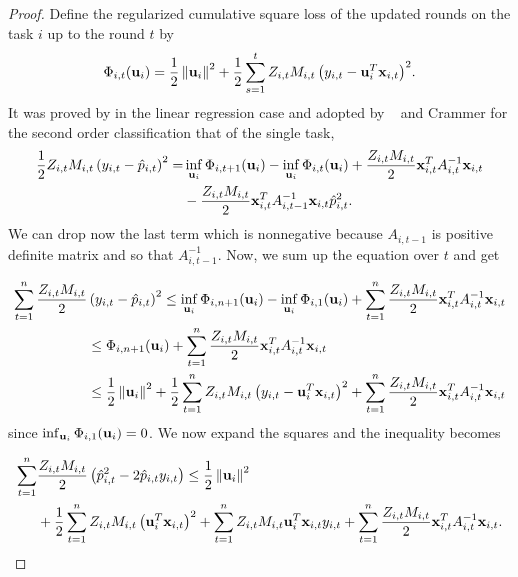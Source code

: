 \begin{proof}
Define the regularized cumulative square loss of the updated rounds on the task 
$i$ up to the round $t$ by
\begin{equation*}
\Phi_{i,t}(\mathbf{u}_i)=\frac{1}{2}\left\Vert {\mathbf{u}_i} \right\Vert^2+\frac{1}{2}\sum_{s=1}^{t}{Z_{i,t}M_{i,t}\left({y_{i,t}-\mathbf{u}_i^T\mathbf{x}_{i,t}}\right)}^2.
\end{equation*}
It was proved by \cite{Forster} in the linear regression case and adopted by
~\cite{cesa2006worst} and Crammer \cite{crammer2014doubly} for the second order classification that of the single task,
\begin{equation*}
\begin{split}
\frac{1}{2} Z_{i,t}M_{i,t}\left({y_{i,t}-\hat{p}_{i,t}}\right)^{2}= &\inf_{\mathbf{u}_i}{\Phi_{i,t+1}}(\mathbf{u}_i)-\inf_{\mathbf{u}_i}{\Phi_{i,t}}(\mathbf{u}_i)
+\frac{Z_{i,t}M_{i,t}}{2}\mathbf{x}_{i,t}^TA_{i,t}^{-1}\mathbf{x}_{i,t}\\
&-\frac{Z_{i,t}M_{i,t}}{2}\mathbf{x}_{i,t}^TA_{i,t-1}^{-1}\mathbf{x}_{i,t}\hat{p}_{i,t}^2.
\end{split}
\end{equation*} 
We can drop now the last term which is nonnegative because $A_{i,t-1}$ is 
positive definite matrix and so that $A_{i,t-1}^{-1}$.
Now, we sum up the equation over $t$ and get

\begin{equation*}
 \begin{split}
\sum_{t=1}^{n}\frac{Z_{i,t}M_{i,t}}{2}&\left({y_{i,t}-\hat{p}_{i,t}}\right)^{2} \le \inf_{\mathbf{u}_i}{\Phi_{i,n+1}}(\mathbf{u}_i)
-\inf_{\mathbf{u}_i}{\Phi_{i,1}}(\mathbf{u}_i)+\sum_{t=1}^{n}\frac{Z_{i,t}M_{i,t}}{2}\mathbf{x}_{i,t}^TA_{i,t}^{-1}\mathbf{x}_{i,t}\\
&\le  \Phi_{i,n+1}(\mathbf{u}_i)+\sum_{t=1}^{n}\frac{Z_{i,t}M_{i,t}}{2}\mathbf{x}_{i,t}^TA_{i,t}^{-1}\mathbf{x}_{i,t}\\
&\le  \frac{1}{2}\left\Vert {\mathbf{u}_i} \right\Vert^2+\frac{1}{2}\sum_{t=1}^{n}{Z_{i,t}M_{i,t}\left({y_{i,t}-\mathbf{u}_i^T\mathbf{x}_{i,t}}\right)}^2+
\sum_{t=1}^{n}\frac{Z_{i,t}M_{i,t}}{2}\mathbf{x}_{i,t}^TA_{i,t}^{-1}\mathbf{x}_{i,t}\\
\end{split}
\end{equation*} 
since $\inf_{\mathbf{u}_i}{\Phi_{i,1}}(\mathbf{u}_i)=0$. We now expand the squares and the 
inequality becomes

\begin{equation} \label{eq:so_first_step}
 \begin{split}
   \sum_{t=1}^{n}&\frac{Z_{i,t}M_{i,t}}{2}\left({\hat{p}_{i,t}^2-2\hat{p}_{i,t}y_{i,t}}\right)
   \le  \frac{1}{2}\left\Vert {\mathbf{u}_i} \right\Vert^2 \\
   &+\frac{1}{2}\sum_{t=1}^{n}{Z_{i,t}M_{i,t}\left({\mathbf{u}_i^T\mathbf{x}_{i,t}}\right)}^2 
   +\sum_{t=1}^{n}{Z_{i,t}M_{i,t}\mathbf{u}_i^T\mathbf{x}_{i,t}y_{i,t}}
+\sum_{t=1}^{n}\frac{Z_{i,t}M_{i,t}}{2}\mathbf{x}_{i,t}^TA_{i,t}^{-1}\mathbf{x}_{i,t}.\\
\end{split}
\end{equation} 


\end{proof}
